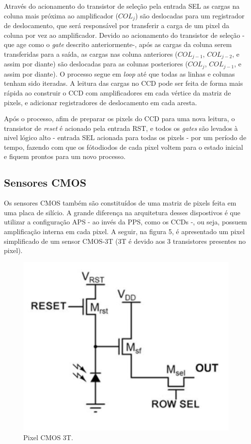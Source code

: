\documentclass[10pt,a4paper,twocolumn]{article}
\begin{document}
	Através do acionamento do transistor de seleção pela entrada SEL as cargas na coluna mais próxima ao amplificador ($COL_{j}$) são deslocadas para um registrador de deslocamento, que será responsável por transferir a carga de um pixel da coluna por vez ao amplificador. Devido ao acionamento do transistor de seleção - que age como o \textit{gate} descrito anteriormente-, após as cargas da coluna serem transferidas para a saída, as cargas nas coluna anteriores ($COL_{j-1}$, $COL_{j-2}$, e assim por diante) são deslocadas para as colunas posteriores ($COL_{j}$, $COL_{j-1}$, e assim por diante). O processo segue em \textit{loop} até que todas as linhas e colunas tenham sido iteradas. A leitura das cargas no CCD pode ser feita de forma mais rápida ao construir o CCD com amplificadores em cada vértice da matriz de pixels, e adicionar registradores de deslocamento em cada aresta.
	
	Após o processo, afim de preparar os pixels do CCD para uma nova leitura, o transistor de \textit{reset} é acionado pela entrada RST, e todos os \textit{gates} são levados à nivel lógico alto - entrada SEL acionada para todas os pixels - por um período de tempo, fazendo com que os fótodiodos de cada pixel voltem para o estado inicial e fiquem prontos para um novo processo.
	
	\subsection*{Sensores CMOS}
	Os sensores CMOS também são constituídos de uma matriz de pixels feita em uma placa de silício. A grande diferença na arquitetura desses dispostivos é que utilizar a configuração APS - ao invés da PPS, como os CCDs -, ou seja, possuem amplificação interna em cada pixel. A seguir, na figura 5, é apresentado um pixel simplificado de um sensor CMOS-3T (3T é devido aos 3 transistores presentes no pixel).
	
	\begin{figure}[!h]
		\centering
		\includegraphics[scale=0.09]{imagens/cmos_3t.jpg}
		\caption{Pixel CMOS 3T.}
	\end{figure}
	
\end{document}
